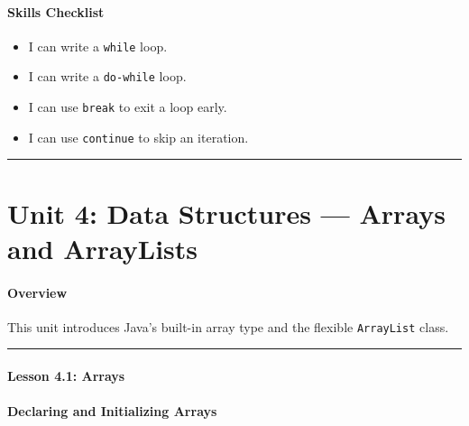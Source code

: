 \documentclass[
  justified,
  openright,
]{tufte-book}
\let\subsection\paragraph
\let\paragraph\paragraph
\let\subsection\paragraph
\let\paragraph\paragraph
\providecommand{\tightlist}{%
  \setlength{\itemsep}{0pt}\setlength{\parskip}{0pt}}
\begin{document}
\subsection{Skills Checklist}\label{skills-checklist-76}

\begin{itemize}
\tightlist
\item[$\square$]
  I can write a \texttt{while} loop.
\item[$\square$]
  I can write a \texttt{do-while} loop.
\item[$\square$]
  I can use \texttt{break} to exit a loop early.
\item[$\square$]
  I can use \texttt{continue} to skip an iteration.
\end{itemize}

\begin{center}\rule{0.5\linewidth}{0.5pt}\end{center}

\section{Unit 4: Data Structures --- Arrays and
ArrayLists}\label{unit-4-data-structures-arrays-and-arraylists}

\subsection{Overview}\label{overview-18}

This unit introduces Java's built-in array type and the flexible
\texttt{ArrayList} class.

\begin{center}\rule{0.5\linewidth}{0.5pt}\end{center}

\subsection{Lesson 4.1: Arrays}\label{lesson-4.1-arrays-2}

\subsection{Declaring and Initializing
Arrays}\label{declaring-and-initializing-arrays}
\end{document}
